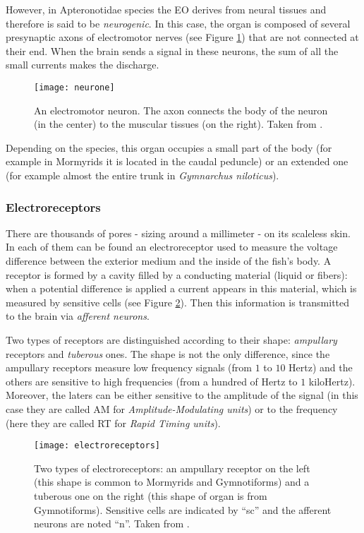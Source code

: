 However, in Apteronotidae species the EO derives from neural tissues
and therefore is said to be \emph{neurogenic}. In this case, the organ
is composed of several presynaptic axons of electromotor nerves (see
Figure \ref{fig:neurone}) that are not connected at their end. When
the brain sends a signal in these neurons, the sum of all the small
currents makes the discharge.

%
\begin{figure}
\centering\texttt{[image: neurone]}

\caption{An electromotor neuron. The axon connects the body of the neuron (in
the center) to the muscular tissues (on the right). Taken from \cite{rouviere2002}.
\label{fig:neurone}}

\end{figure}


Depending on the species, this organ occupies a small part of the
body (for example in Mormyrids it is located in the caudal peduncle)
or an extended one (for example almost the entire trunk in \emph{Gymnarchus
niloticus}).


\subsubsection*{Electroreceptors}

\label{sub:electrorecepteurs}

There are thousands of pores - sizing around a millimeter - on its
scaleless skin. In each of them can be found an electroreceptor
used to measure the voltage difference between the exterior medium
and the inside of the fish's body. A receptor is formed by a
cavity filled by a conducting material (liquid or fibers): when a
potential difference is applied a current appears in this
material, which is measured by sensitive cells (see Figure
\ref{fig:electroreceptor}). Then this information is transmitted
to the brain via \emph{afferent neurons}.

Two types of receptors are distinguished according to their shape:
\emph{ampullary} receptors and \emph{tuberous} ones. The shape is
not the only difference, since the ampullary receptors measure low
frequency signals (from $1$ to $10$ Hertz) and the others are
sensitive to high frequencies (from a hundred of Hertz to $1$
kiloHertz). Moreover, the laters can be either sensitive to the
amplitude of the signal (in this case they are called AM for
\emph{Amplitude-Modulating units}) or to the frequency (here they
are called RT for \emph{Rapid Timing
units}). %
\begin{figure}[h]
 \centering \texttt{[image: electroreceptors]} \caption{Two types of electroreceptors:
 an ampullary receptor on the left (this
shape is common to Mormyrids and Gymnotiforms) and a tuberous one
on the right (this shape of organ is from Gymnotiforms). Sensitive
cells are indicated by {}``sc'' and the afferent neurons are noted
{}``n''. Taken from \cite{moller1995electric}. \label{fig:electroreceptor}}

\end{figure}


